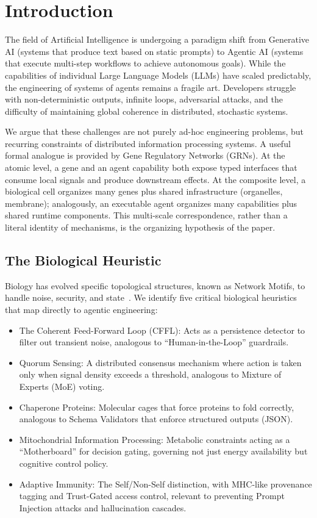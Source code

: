 \section{Introduction}

The field of Artificial Intelligence is undergoing a paradigm shift from Generative AI (systems that
produce text based on static prompts) to Agentic AI (systems that execute multi-step workflows to
achieve autonomous goals). While the capabilities of individual Large Language Models (LLMs) have
scaled predictably, the engineering of systems of agents remains a fragile art. Developers struggle with
non-deterministic outputs, infinite loops, adversarial attacks, and the difficulty of maintaining global
coherence in distributed, stochastic systems.

We argue that these challenges are not purely ad-hoc engineering problems, but recurring constraints of
distributed information processing systems. A useful formal analogue is provided by Gene Regulatory
Networks (GRNs). At the atomic level, a gene and an agent capability both expose typed interfaces that
consume local signals and produce downstream effects. At the composite level, a biological cell organizes
many genes plus shared infrastructure (organelles, membrane); analogously, an executable agent organizes
many capabilities plus shared runtime components. This multi-scale correspondence, rather than a literal
identity of mechanisms, is the organizing hypothesis of the paper.

\subsection{The Biological Heuristic}

Biology has evolved specific topological structures, known as Network Motifs, to handle noise, security,
and state~\cite{milo2002network}. We identify five critical biological heuristics that map directly to agentic engineering:
\begin{itemize}[leftmargin=*]
\item The Coherent Feed-Forward Loop (CFFL): Acts as a persistence detector to filter out transient noise,
analogous to ``Human-in-the-Loop'' guardrails.
\item Quorum Sensing: A distributed consensus mechanism where action is taken only when signal density
exceeds a threshold, analogous to Mixture of Experts (MoE) voting.
\item Chaperone Proteins: Molecular cages that force proteins to fold correctly, analogous to Schema
Validators that enforce structured outputs (JSON).
\item Mitochondrial Information Processing: Metabolic constraints acting as a ``Motherboard'' for
decision gating, governing not just energy availability but cognitive control policy.
\item Adaptive Immunity: The Self/Non-Self distinction, with MHC-like provenance tagging and Trust-Gated
access control, relevant to preventing Prompt Injection attacks and hallucination cascades.
\end{itemize}

